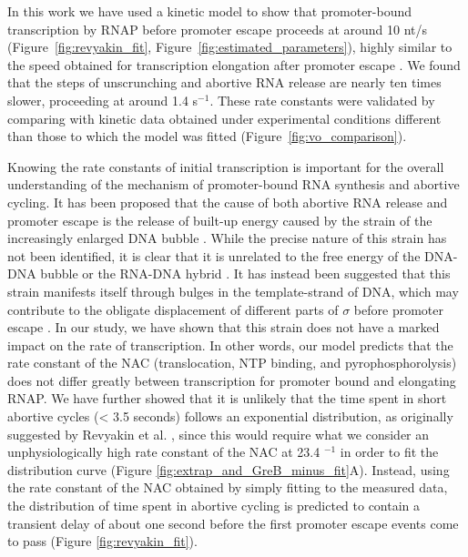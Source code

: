 %
In this work we have used a kinetic model to show that promoter-bound
transcription by RNAP before promoter escape proceeds at around 10 nt/s
(Figure~\ref{fig:revyakin_fit}, Figure~\ref{fig:estimated_parameters}), highly
similar to the speed obtained for transcription elongation after promoter
escape \cite{revyakin_abortive_2006}. We found that the steps of unscrunching
and abortive RNA release are nearly ten times slower, proceeding at around 1.4
s$^{-1}$. These rate constants were validated by comparing with kinetic data
obtained under experimental conditions different than those to which the model
was fitted (Figure~\ref{fig:vo_comparison}).

Knowing the rate constants of initial transcription is important for the overall
understanding of the mechanism of promoter-bound RNA synthesis and abortive
cycling. It has been proposed that the cause of both abortive RNA release and
promoter escape is the release of built-up energy caused by the strain of the
increasingly enlarged DNA bubble \cite{straney_stressed_1987,
hsu_promoter_2002, revyakin_abortive_2006}. While the precise nature of this
strain has not been identified, it is clear that it is unrelated to the free
energy of the DNA-DNA bubble or the RNA-DNA hybrid \cite{hsu_initial_2006,
skancke_sequence-dependent_2015}. It has instead been suggested that this
strain manifests itself through bulges in the template-strand of DNA, which
may contribute to the obligate displacement of different parts of $\sigma$
before promoter escape \cite{winkelman_crosslink_2015}. In our study, we have
shown that this strain does not have a marked impact on the rate of
transcription. In other words, our model predicts that the rate constant of
the NAC (translocation, NTP binding, and pyrophosphorolysis) does not differ
greatly between transcription for promoter bound and elongating RNAP. We have
further showed that it is unlikely that the time spent in short abortive
cycles (< 3.5 seconds) follows an exponential distribution, as originally
suggested by Revyakin et al. \cite{revyakin_abortive_2006}, since this would
require what we consider an unphysiologically high rate constant of the NAC at
23.4 $^{-1}$ in order to fit the distribution curve (Figure
\ref{fig:extrap_and_GreB_minus_fit}A). Instead, using the rate constant of the
NAC obtained by simply fitting to the measured data, the distribution of time
spent in abortive cycling is predicted to contain a transient delay of about
one second before the first promoter escape events come to pass (Figure
\ref{fig:revyakin_fit}).

